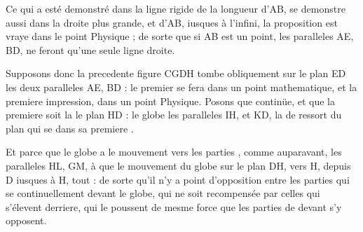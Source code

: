 \documentclass[11pt,a4paper]{article}
\begin{document}
Ce qui a esté demonstré dans la ligne rigide de la longueur d'AB, se demonstre aussi dans la droite  plus grande, et \ill{} d'AB, iusques à l'infini, \ill{} \ill{} \ill{} \ill{} la proposition est vraye dans le point Physique ; de sorte que si AB est un point, les paralleles AE, BD, ne feront qu'une seule ligne droite.

Supposons donc la precedente figure \ill{} \ill{} \ill{} \ill{} \ill{} \ill{}  \ill{} \ill{} \ill{} \ill{} CGDH tombe obliquement sur \struck{\ill{}} le plan ED \ill{} les deux paralleles AE, BD : \struck{\ill{}} \ill{} le premier \struck{\ill{}} \ill{} \ill{} \ill{} \ill{} se fera dans un point mathematique, et la premiere impression, dans un point Physique. Posons que \ill{} \ill{} \ill{} continüe, et que la premiere soit la \ill{} \ill{} \ill{} \ill{} \ill{} \ill{} \ill{} le plan HD : le globe  \ill{} \ill{} \ill{} les paralleles IH, et KD,  la  de ressort du plan qui se \struck{\ill{}}  dans sa premiere  \ill{}.

Et parce que le globe a  le mouvement  vers les parties \ill{} \ill{}, comme auparavant,  les paralleles HL, GM,  à   que le mouvement du globe  sur le plan DH, vers H,  \ill{}   depuis D iusques à H,  tout  : de sorte \struck{\ill{} \ill{} \ill{} \ill{}} qu'il n'y a point d'opposition entre les parties \struck{\ill{}}  \struck{\ill{} \ill{} \ill{}} qui se  continuellement devant le globe, qui ne soit recompensée par celles qui s'élevent derriere, \ill{} qui le poussent de mesme force que les parties de devant \struck{\ill{}} s'y opposent.
\end{document}
